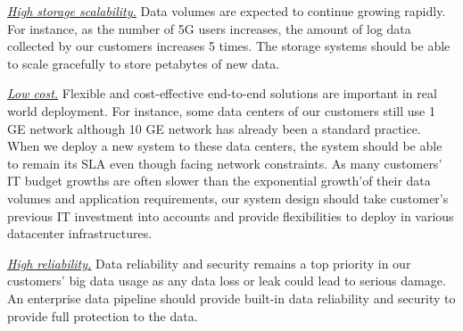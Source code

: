 

\noindent \underline{\textit{High storage scalability.}}  Data volumes are expected to continue growing rapidly. For instance, as the number of 5G users increases, the amount of log data collected by our customers increases 5 times. The storage systems should be able to scale gracefully to store petabytes of new data.



\noindent \underline{\textit{Low cost.}} Flexible and cost-effective end-to-end solutions are important in real world deployment. For instance, some data centers of our customers still use 1 GE network although 10 GE network has already been a standard practice. When we deploy a new system to these data centers, the system should be able to remain its SLA even though facing network constraints. As many customers' IT budget growths are often slower than the exponential growth'of their data volumes and application requirements, our system design should take customer's previous IT investment into accounts and provide flexibilities to deploy in various datacenter infrastructures.





\noindent \underline{\textit{High reliability.}} Data reliability and security remains a top priority in our customers' big data usage as any data loss or leak  could lead to serious damage. An enterprise data pipeline should provide built-in data reliability and security to provide full protection to the data.











